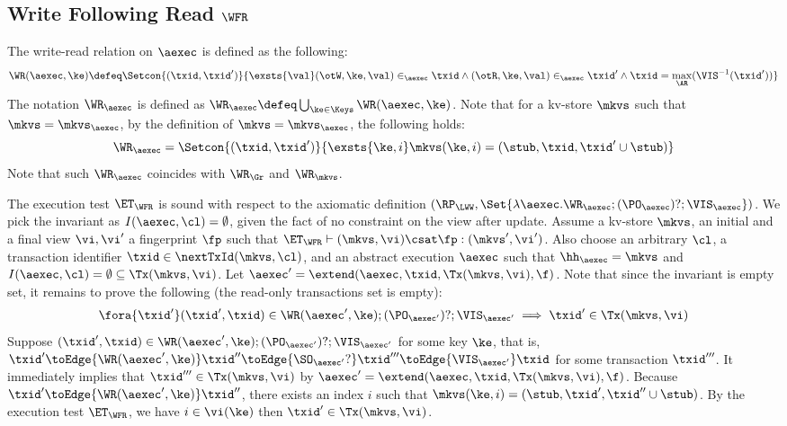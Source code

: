 \subsection{Write Following Read \( \WFR \) }
\label{sec:sound-complete-wfr}

The write-read relation  on \( \aexec \) is defined as the following:
\[
\WR(\aexec, \ke) \defeq \Setcon{ (\txid, \txid') }{ \exsts{\val} (\otW, \ke, \val) \in_\aexec \txid \land (\otR, \ke, \val) \in_\aexec \txid' \land \txid = \max_\AR(\VIS^{-1}(\txid')) }
\]
The notation \( \WR_\aexec \) is defined as \( \WR_\aexec \defeq \bigcup_{\ke \in \Keys} \WR(\aexec, \ke) \).
Note that for a kv-store \( \mkvs \) such that \( \mkvs = \mkvs_\aexec \),
by the definition of  \(  \mkvs = \mkvs_\aexec \), 
the following holds:
\[
    \WR_\aexec = \Setcon{(\txid, \txid')}{\exsts{\ke, i } \mkvs(\ke, i) = (\stub, \txid, \txid'\cup \stub)}
\]
Note that such \( \WR_\aexec \) coincides with \( \WR_\Gr \) and \( \WR_\mkvs \).

The execution test $\ET_\WFR$ is sound with respect to the axiomatic definition 
\( (\RP_{\LWW}, \Set{\lambda \aexec. \WR_\aexec ; (\PO_{\aexec})? ; \VIS_{\aexec} })\).
We pick the invariant as \( I( \aexec, \cl ) = \emptyset \), given the fact of no constraint on the view after update.
Assume a kv-store $\mkvs$, an initial and a final view $\vi, \vi'$  a fingerprint $\fp$ 
such that $\ET_{\WFR} \vdash (\mkvs, \vi) \csat \fp: (\mkvs', \vi')$. 
Also choose an arbitrary $\cl$, a transaction identifier $\txid \in \nextTxId(\mkvs, \cl)$, 
and an abstract execution $\aexec$ such that $\hh_{\aexec} = \mkvs$ and 
\( I(\aexec, \cl) =  \emptyset \subseteq \Tx(\mkvs, \vi) \).
Let \( \aexec' = \extend(\aexec, \txid, \Tx(\mkvs, \vi) , \f ) \).
Note that since the invariant is empty set, it remains to prove the following (the read-only transactions set is empty):
\[
    \begin{array}{@{}l@{}}
        \fora{ \txid' } 
        (\txid' ,\txid)  \in \WR(\aexec',\ke) ; (\PO_{\aexec'})? ; \VIS_{\aexec'} 
        \implies \txid' \in \Tx(\mkvs, \vi) 
    \end{array}
\]
Suppose \( (\txid' ,\txid)  \in \WR(\aexec', \ke) ; (\PO_{\aexec'})? ; \VIS_{\aexec'} \) for some key \( \ke \),
that is, \( \txid' \toEdge{\WR(\aexec', \ke)} \txid'' \toEdge{\SO_{\aexec'}?} \txid''' \toEdge{\VIS_{\aexec'}} \txid \) for some transaction \( \txid''' \).
It immediately implies that \( \txid''' \in \Tx(\mkvs, \vi)  \) by \( \aexec' = \extend(\aexec, \txid, \Tx(\mkvs, \vi) , \f ) \).
Because \( \txid' \toEdge{\WR(\aexec', \ke)} \txid'' \), there exists an index \( i \) such that \( \mkvs(\ke, i) = (\stub, \txid', \txid'' \cup \stub) \).
By the execution test \( \ET_\WFR \), we have \( i \in \vi( \ke ) \) then \( \txid' \in \Tx(\mkvs, \vi ) \).


